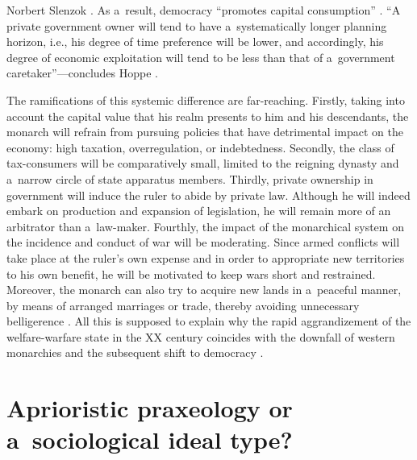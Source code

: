 \begin{artengenv}{Norbert Slenzok}
\parencite[][pp.45–46]{hoppe_democracy_2007}. %
 As a~result, democracy ``promotes capital consumption'' 
\parencite[][p.119]{hoppe_short_2015}. %
 ``A private government owner will tend to have a~systematically longer planning horizon, i.e., his degree of time preference will be lower, and accordingly, his degree of economic exploitation will tend to be less than that of a~government caretaker''---concludes Hoppe 
\parencite*[][p.46]{hoppe_democracy_2007}.%




The ramifications of this systemic difference are far-reaching. Firstly, taking into account the capital value that his realm presents to him and his descendants, the monarch will refrain from pursuing policies that have detrimental impact on the economy: high taxation, overregulation, or indebtedness. Secondly, the class of tax-consumers will be comparatively small, limited to the reigning dynasty and a~narrow circle of state apparatus members. Thirdly, private ownership in government will induce the ruler to abide by private law. Although he will indeed embark on production and expansion of legislation, he will remain more of an arbitrator than a~law-maker. Fourthly, the impact of the monarchical system on the incidence and conduct of war will be moderating. Since armed conflicts will take place at the ruler's own expense and in order to appropriate new territories to his own benefit, he will be motivated to keep wars short and restrained. Moreover, the monarch can also try to acquire new lands in a~peaceful manner, by means of arranged marriages or trade, thereby avoiding unnecessary belligerence 
\parencite[][pp.19–23, 46–50]{hoppe_democracy_2007}. %
 All this is supposed to explain why the rapid aggrandizement of the welfare-warfare state in the XX century coincides with the downfall of western monarchies and the subsequent shift to democracy 
\parencite[][pp.50–74]{hoppe_democracy_2007}.%




\section{Aprioristic praxeology or a~sociological ideal type?}


\end{artengenv}
